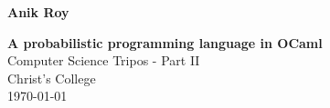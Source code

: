 \documentclass[12pt,notitlepage,a4paper]{report}
\begin{document}
\pagestyle{empty}

\hfill{\LARGE \bf Anik Roy}

\vspace*{\fill}
\begin{center}
	\huge
	\textbf{A probabilistic programming language in OCaml}\\
	\vspace*{8mm}
	{\LARGE Computer Science Tripos - Part II} \\
	{\LARGE Christ's College} \\
	{\LARGE \today}
\end{center}
\vspace*{\fill}

\cleardoublepage


\setcounter{page}{1}
\pagestyle{plain}


\cleardoublepage


\setcounter{page}{1}
\pagestyle{headings}









\appendix




\end{document}
